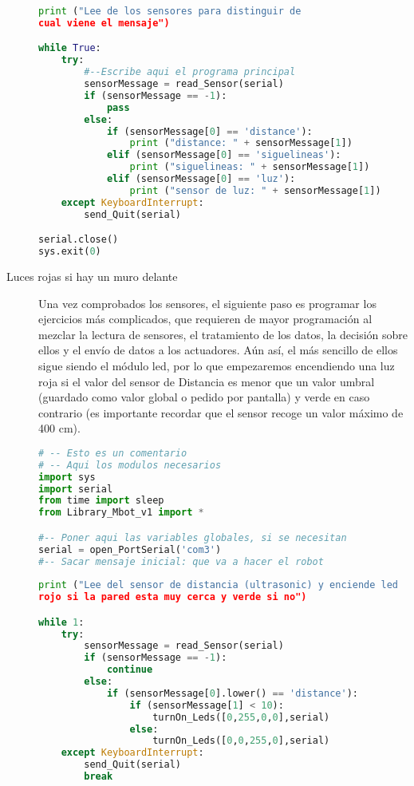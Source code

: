 \begin{description}
\begin{lstlisting}[language=python,caption={Solución para distinguir los sensores en Python}]
print ("Lee de los sensores para distinguir de 
cual viene el mensaje")

while True:
	try:
		#--Escribe aqui el programa principal
		sensorMessage = read_Sensor(serial)
		if (sensorMessage == -1):
			pass
		else:
			if (sensorMessage[0] == 'distance'):
				print ("distance: " + sensorMessage[1])
			elif (sensorMessage[0] == 'siguelineas'):
				print ("siguelineas: " + sensorMessage[1])
			elif (sensorMessage[0] == 'luz'):
				print ("sensor de luz: " + sensorMessage[1])
	except KeyboardInterrupt:
		send_Quit(serial)

serial.close()
sys.exit(0)
\end{lstlisting}

	\item [Luces rojas si hay un muro delante] Una vez comprobados los sensores, el siguiente paso es programar los ejercicios más complicados, que requieren de mayor programación al mezclar la lectura de sensores, el tratamiento de los datos, la decisión sobre ellos y el envío de datos a los actuadores. Aún así, el más sencillo de ellos sigue siendo el módulo led, por lo que empezaremos encendiendo una luz roja si el valor del sensor de Distancia es menor que un valor umbral (guardado como valor global o pedido por pantalla) y verde en caso contrario (es importante recordar que el sensor recoge un valor máximo de 400 cm).
\begin{lstlisting}[language=python,caption={Solución del ejercicio de LEDS y sensor de Distancia en Python}]
# -- Esto es un comentario		
# -- Aqui los modulos necesarios
import sys
import serial
from time import sleep
from Library_Mbot_v1 import *

#-- Poner aqui las variables globales, si se necesitan
serial = open_PortSerial('com3')
#-- Sacar mensaje inicial: que va a hacer el robot
	
print ("Lee del sensor de distancia (ultrasonic) y enciende led 
rojo si la pared esta muy cerca y verde si no")

while 1:
	try:
		sensorMessage = read_Sensor(serial)    
		if (sensorMessage == -1):
			continue
		else:
			if (sensorMessage[0].lower() == 'distance'):
				if (sensorMessage[1] < 10):
					turnOn_Leds([0,255,0,0],serial)
				else:
					turnOn_Leds([0,0,255,0],serial)
	except KeyboardInterrupt:
		send_Quit(serial)
		break
	

\end{lstlisting}
\end{description}
